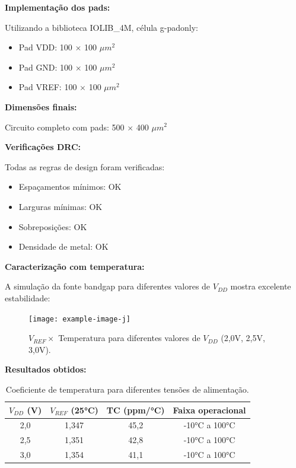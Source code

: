 ﻿\documentclass[12pt,a4paper]{article}
\begin{document}
\textbf{Implementação dos pads:}

Utilizando a biblioteca IOLIB\_4M, célula g-padonly:
\begin{itemize}
    \item Pad VDD: 100 $\times$ 100 $\mu m^2$
    \item Pad GND: 100 $\times$ 100 $\mu m^2$  
    \item Pad VREF: 100 $\times$ 100 $\mu m^2$
\end{itemize}

\textbf{Dimensões finais:}

Circuito completo com pads: 500 $\times$ 400 $\mu m^2$

\textbf{Verificações DRC:}

Todas as regras de design foram verificadas:
\begin{itemize}
    \item Espaçamentos mínimos: OK
    \item Larguras mínimas: OK
    \item Sobreposições: OK
    \item Densidade de metal: OK
\end{itemize}

\textbf{Caracterização com temperatura:}

A simulação da fonte bandgap para diferentes valores de $V_{DD}$ mostra excelente estabilidade:

\begin{figure}[H]
\centering
\texttt{[image: example-image-j]}
\caption{$V_{REF} \times$ Temperatura para diferentes valores de $V_{DD}$ (2,0V, 2,5V, 3,0V).}
\label{fig:vref_temp}
\end{figure}

\textbf{Resultados obtidos:}

\begin{table}[H]
\centering
\caption{Coeficiente de temperatura para diferentes tensões de alimentação.}
\label{tab:tc_results}
\begin{tabular}{cccc}
\toprule
$V_{DD}$ (V) & $V_{REF}$ (25°C) & TC (ppm/°C) & Faixa operacional \\
\midrule
2,0 & 1,347 & 45,2 & -10°C a 100°C \\
2,5 & 1,351 & 42,8 & -10°C a 100°C \\
3,0 & 1,354 & 41,1 & -10°C a 100°C \\
\bottomrule
\end{tabular}
\end{table}
\end{document}
